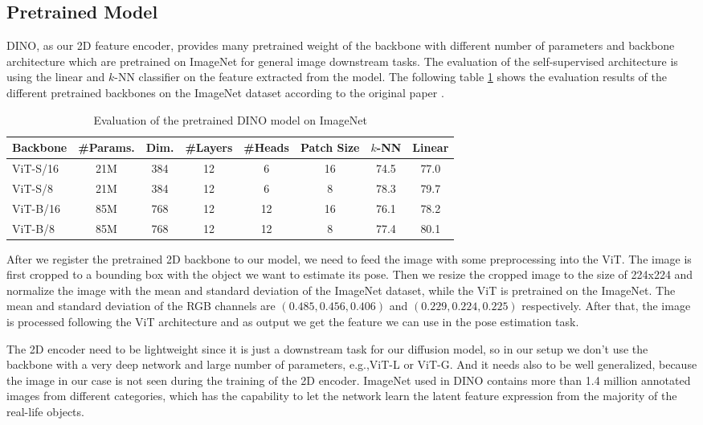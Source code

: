 \documentclass[12pt,DIV14,BCOR12mm,a4paper,footinclude=false,headinclude,parskip=half-,twoside,openright,cleardoublepage=empty,toc=index,bibliography=totoc,listof=totoc]{scrreprt}
\numberwithin{equation}{chapter}
\begin{document}
\subsection{Pretrained Model} 
DINO, as our 2D feature encoder, provides many pretrained weight of the backbone with different number of parameters and backbone architecture which are pretrained on ImageNet for general image downstream tasks. The evaluation of the self-supervised architecture is using the linear and $k$-NN classifier on the feature extracted from the model. The following table \ref{tab:dino} shows the evaluation results of the different pretrained backbones on the ImageNet dataset according to the original paper \cite{caron2021emerging}.
\begin{table}[ht]
  \centering
  \caption{Evaluation of the pretrained DINO model on ImageNet}
  \label{tab:dino}
  \begin{tabular}{l c c c c c c c}
      \toprule
      Backbone & \#Params. & Dim. & \#Layers & \#Heads & Patch Size & $k$-NN & Linear\\
      \midrule
      ViT-S/16 & 21M & 384 & 12 & 6 & 16 & 74.5 & 77.0 \\
      ViT-S/8 & 21M & 384 & 12 & 6 & 8 & 78.3 & 79.7 \\
      ViT-B/16 & 85M & 768 & 12 & 12 & 16 & 76.1 & 78.2 \\
      ViT-B/8 & 85M & 768 & 12 & 12 & 8 & 77.4 & 80.1 \\
      \bottomrule
  \end{tabular}
\end{table}

After we register the pretrained 2D backbone to our model, we need to feed the image with some preprocessing into the ViT. The image is first cropped to a bounding box with the object we want to estimate its pose. Then we resize the cropped image to the size of 224x224 and normalize the image with the mean and standard deviation of the ImageNet dataset, while the ViT is pretrained on the ImageNet. The mean and standard deviation of the RGB channels are $(0.485, 0.456, 0.406)$ and $(0.229, 0.224, 0.225)$ respectively. After that, the image is processed following the ViT architecture and as output we get the feature we can use in the pose estimation task. 

The 2D encoder need to be lightweight since it is just a downstream task for our diffusion model, so in our setup we don't use the backbone with a very deep network and large number of parameters, e.g.,ViT-L or ViT-G. And it needs also to be well generalized, because the image in our case is not seen during the training of the 2D encoder. ImageNet used in DINO contains more than 1.4 million annotated images from different categories, which has the capability to let the network learn the latent feature expression from the majority of the real-life objects. 
\end{document}
